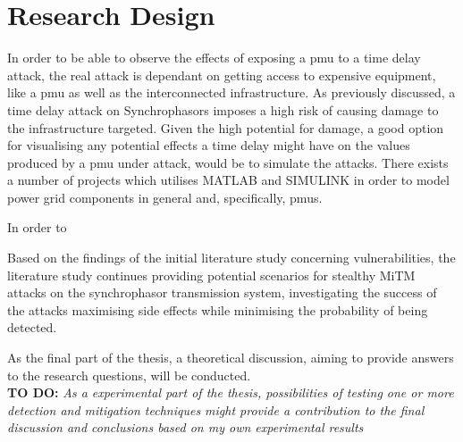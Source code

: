 




\section{Research Design}

In order to be able to observe the effects of exposing a \acrshort{pmu} to a time delay attack, the real attack is dependant on getting access to expensive equipment, like a \acrshort{pmu} as well as the interconnected infrastructure.
As previously discussed, a time delay attack on Synchrophasors imposes a high risk of causing damage to the infrastructure targeted.
Given the high potential for damage, a good option for visualising any potential effects a time delay might have on the values produced by a \acrshort{pmu} under attack, would be to simulate the attacks.
There exists a number of projects which utilises MATLAB and SIMULINK in order to model power grid components in general and, specifically, \acrshort{pmu}s.



In order to 

Based on the findings of the initial literature study concerning vulnerabilities, the literature study continues providing potential scenarios for stealthy MiTM attacks on the synchrophasor transmission system, investigating the success of the attacks maximising side effects while minimising the probability of being detected.

As the final part of the thesis, a theoretical discussion, aiming to provide answers to the research questions, will be conducted.\\ 

\textbf{TO DO:}
\textit{As a experimental part of the thesis, possibilities of testing one or more detection and mitigation techniques might provide a contribution to the final discussion and conclusions based on my own experimental results}


